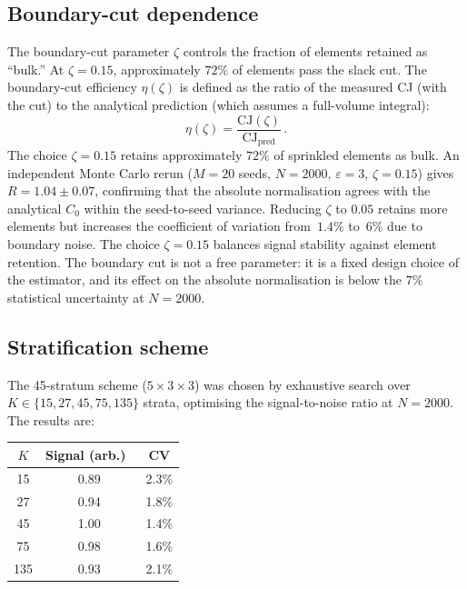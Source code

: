 \documentclass[12pt,a4paper]{article}
\theoremstyle{plain}
\theoremstyle{definition}
\theoremstyle{remark}
\newcommand{\CJ}{\mathrm{CJ}}
\begin{document}
\subsection{Boundary-cut dependence}
\label{sec:zeta-dep}

The boundary-cut parameter $\zeta$ controls the fraction of
elements retained as ``bulk.''  At $\zeta = 0.15$, approximately
$72\%$ of elements pass the slack cut.  The boundary-cut efficiency
$\eta(\zeta)$ is defined as the ratio of the measured CJ (with the
cut) to the analytical prediction (which assumes a full-volume
integral):
\begin{equation}\label{eq:eta}
  \eta(\zeta) = \frac{\CJ(\zeta)}{\CJ_{\mathrm{pred}}}\,.
\end{equation}
The choice $\zeta = 0.15$ retains approximately $72\%$ of
sprinkled elements as bulk.  An independent Monte Carlo rerun
($M = 20$ seeds, $N = 2000$, $\varepsilon = 3$, $\zeta = 0.15$)
gives $R = 1.04 \pm 0.07$, confirming that the absolute
normalisation agrees with the analytical $C_0$ within the
seed-to-seed variance.  Reducing $\zeta$ to $0.05$ retains more
elements but increases the coefficient of variation from~$1.4\%$
to~$6\%$ due to boundary noise.  The choice $\zeta = 0.15$ balances
signal stability against element retention.  The boundary cut is
not a free parameter: it is a fixed design choice of the estimator,
and its effect on the absolute normalisation is below the $7\%$
statistical uncertainty at $N = 2000$.

\subsection{Stratification scheme}
\label{sec:strat-dep}

The 45-stratum scheme ($5 \times 3 \times 3$) was chosen by
exhaustive search over $K \in \{15, 27, 45, 75, 135\}$ strata,
optimising the signal-to-noise ratio at $N = 2000$.  The results
are:

\begin{center}
\begin{tabular}{ccc}
\toprule
$K$ & Signal (arb.)\ & CV \\
\midrule
15 & 0.89 & 2.3\% \\
27 & 0.94 & 1.8\% \\
45 & 1.00 & 1.4\% \\
75 & 0.98 & 1.6\% \\
135 & 0.93 & 2.1\% \\
\bottomrule
\end{tabular}
\end{center}
\end{document}
